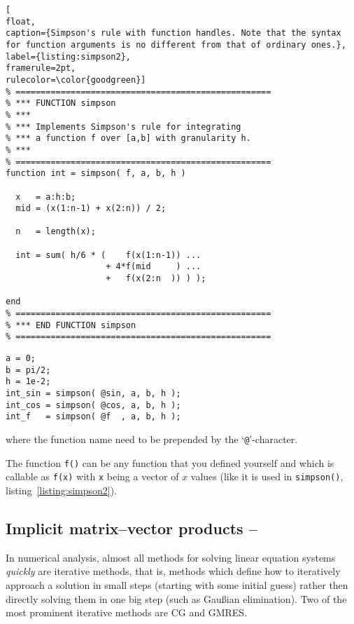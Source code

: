 \begin{lstlisting}[
float,
caption={Simpson's rule with function handles. Note that the syntax for function arguments is no different from that of ordinary ones.},
label={listing:simpson2},
framerule=2pt,
rulecolor=\color{goodgreen}]
% ===================================================
% *** FUNCTION simpson
% ***
% *** Implements Simpson's rule for integrating
% *** a function f over [a,b] with granularity h.
% ***
% ===================================================
function int = simpson( f, a, b, h )

  x   = a:h:b;
  mid = (x(1:n-1) + x(2:n)) / 2;

  n   = length(x);

  int = sum( h/6 * (    f(x(1:n-1)) ...
                    + 4*f(mid     ) ...
                    +   f(x(2:n  )) ) );

end
% ===================================================
% *** END FUNCTION simpson
% ===================================================
\end{lstlisting}

\hfill
\begin{minipage}[t]{.90\textwidth}
\begin{lstlisting}[framerule=1pt,rulecolor=\color{goodgreen}]
a = 0;
b = pi/2;
h = 1e-2;
int_sin = simpson( @sin, a, b, h );
int_cos = simpson( @cos, a, b, h );
int_f   = simpson( @f  , a, b, h );
\end{lstlisting}
\end{minipage}
\hfill

where the function name need to be prepended by the `\lstinline!@!'-character.

The function \lstinline!f()! can be any function that you defined yourself and
which is callable as \lstinline!f(x)! with \lstinline!x! being a vector of $x$
values (like it is used in \lstinline!simpson()!, listing~\ref{listing:simpson2}).



\subsection{Implicit matrix--vector products -- \cleansymbol}

In numerical analysis, almost all methods for solving linear equation systems
\emph{quickly} are iterative methods, that is, methods which define how to
iteratively approach a solution in small steps (starting with some initial
guess) rather then directly solving them in one big step (such as Gau{\ss}ian
elimination). Two of the most prominent iterative methods are CG and GMRES.


